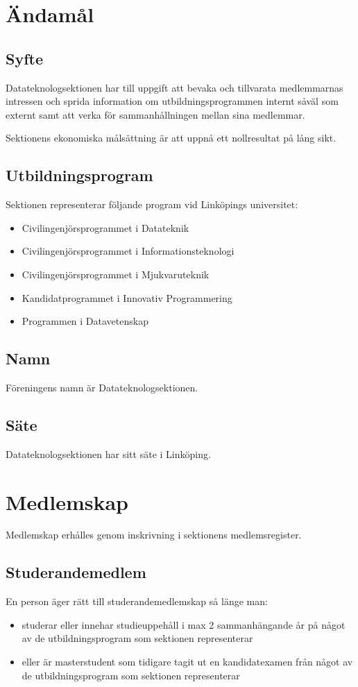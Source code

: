 \documentclass{datateknologsektionen-document}
\begin{document}
\section{Ändamål}
\subsection{Syfte}
\label{syfte}
Datateknologsektionen har till uppgift att bevaka och tillvarata medlemmarnas intressen
och sprida information om utbildningsprogrammen internt såväl som externt samt att
verka för sammanhållningen mellan sina medlemmar.

Sektionens ekonomiska målsättning är att uppnå ett nollresultat på lång sikt.

\subsection{Utbildningsprogram}
\label{utbildningsprogram}
Sektionen representerar följande program vid Linköpings universitet:
\begin{itemize}
  \item Civilingenjörsprogrammet i Datateknik
  \item Civilingenjörsprogrammet i Informationsteknologi
  \item Civilingenjörsprogrammet i Mjukvaruteknik
  \item Kandidatprogrammet i Innovativ Programmering
  \item Programmen i Datavetenskap
\end{itemize}

\subsection{Namn}
Föreningens namn är Datateknologsektionen.

\subsection{Säte}
Datateknologsektionen har sitt säte i Linköping.

\section{Medlemskap}
\label{medlemskap}
Medlemskap erhålles genom inskrivning i sektionens medlemsregister.

\subsection{Studerandemedlem}
En person äger rätt till studerandemedlemskap så länge man:
\begin{itemize}
  \item studerar eller innehar studieuppehåll i max 2 sammanhängande år på något av de
        utbildningsprogram som sektionen representerar
  \item eller är masterstudent som tidigare tagit ut en kandidatexamen från något av de
        utbildningsprogram som sektionen representerar
\end{itemize}
\end{document}
